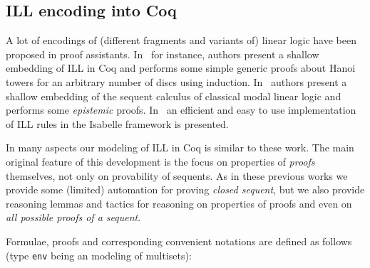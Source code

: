 \documentclass[runningheads,a4paper]{llncs}
\begin{document}
\subsection{ILL encoding into Coq}

A lot of encodings of (different fragments and variants of) linear
logic have been proposed in proof assistants. In~\cite{Power99} for
instance, authors present a shallow embedding of ILL in Coq and
performs some simple generic proofs about Hanoi towers for an
arbitrary number of discs using induction.
In~\cite{Sadrzadeh03modallinear} authors present a shallow embedding
of the sequent calculus of classical modal linear logic and performs
some \emph{epistemic} proofs. In~\cite{Kalvala95mechanizinglinear} an
efficient and easy to use implementation of ILL rules in the Isabelle
framework is presented.

In many aspects our modeling of ILL in Coq is similar to these work.
The main original feature of this development is the focus on
properties of \emph{proofs} themselves, not only on provability of
sequents. As in these previous works we provide some (limited)
automation for proving \emph{closed sequent}, but we also provide reasoning lemmas and tactics
for reasoning on properties of proofs and even on \emph{all possible
  proofs of a sequent}. 

Formulae, proofs and corresponding convenient notations are defined as
follows (type \texttt{env} being an modeling of multisets):
\end{document}
